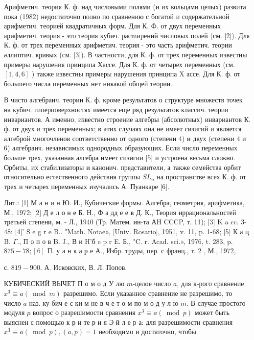 \documentclass[10pt]{article}
\begin{document}
Арифметич. теория К. ф. над числовыми полями (и их кольцами целых) развита пока (1982) недостаточно полно по сравнению с богатой и содержательной арифметич. теорией квадратичных форм. Для К. Ф. от двух переменных арифметич. теория - это теория кубич. расmирений числовых полей (см. [2]). Для К. ф. от трех переменных арифметич. теория - это часть арифметич. теории әллиптич. кривых (см. [3]). В частности, для К. ф. от трех переменных известны примеры нарушения принципа Хассе. Для К. ф. от четырех переменных (см. $[1,4,6]$ ) также известны примеры нарушения принципа X ассе. Для К. ф. от большего числа переменных нет никакой общей теории.



В чисто алгебраич. теории К. ф. кроме результатов о структуре множеств точек на кубич. гиперповерхностях имеется еще ряд результатов классич. теории инвариантов. А именно, известно строение алгебры (абсолютных) инвариантов К. ф. от двух и трех переменных; в әтих случаях она не имеет сизигий и является алгеброй многочленов соответственно от одного (степени 4) и двух (степени 4 и 6) алгебраич. независимых однородных образующих. Если число переменных больше трех, указанная алгебра имеет сизигии [5] и устроена весьма сложно. Орбиты, их стабилизаторы и канонич. представители, а также семейства орбит относительно естественного действия группы $S L_{n}$ на пространстве всех К. ф. от трех и четырех переменных изучались А. Пуанкаре [6].



Лит.: [1] М а н и н Ю. И., Кубические формы. Алгебра, геометрия, арифметика, М., 1972; [2] Д е л о н е Б. Н., Ф а дд е е в Д. К., Теория иррациональностей третьей степени, м. - Л., 1940 (Тр. Матем. ин-та АH CCCP, т. 11); [3] K a cc. 3-48: [4]' S e g r e B.. "Math. Notae», [Univ. Rosario], 1951, v. 11, p. 1-68; [5] К а ц B. $\Gamma$., П о п о в B. J., В и H'б e p r E. Б., "C. r. Acad. sci.», 1976, t. 283, p. $875-78 ;[6]$ П. у а н к а р е А., Избр. труды, пер. с франц., т. 2 , М., 1972,

с. $819-900$. А. Исковских, В. Л. Попов.



КУБИЧЕСКИЙ ВЫЧЕТ П о м о д У лю $m$-целое число $a$, для к-рого сравнение $x^{3} \equiv a(\bmod m)$ разрешимо. Если указанное сравнение не разрешимо, то число $a$ наз. ку бич е с ки м не в ч е т о м по м о д у л ю $m$. В случае простого модуля $p$ вопрос о разрешимости сравнения $x^{3} \equiv a(\bmod p)$ может быть выяснен с помощью к р и те р и я Э й л е р а: для разрешимости сравнения $x^{3} \equiv a(\bmod p),(a, p)=1$ необходимо и достаточно, чтобы
\end{document}
